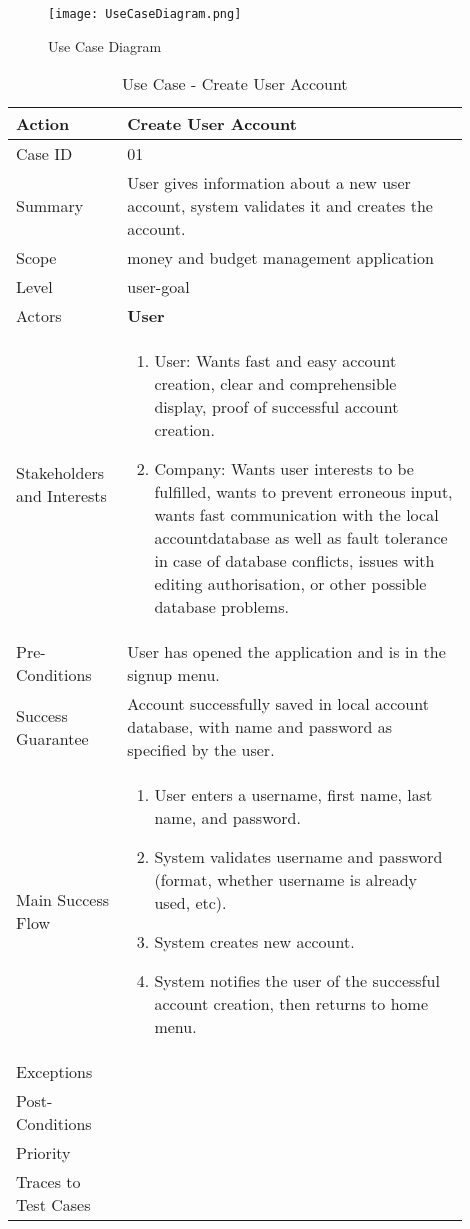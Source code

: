 \documentclass[11pt]{article}
\newcounter{use case ID}
\newcommand\tabularhead[1]{
\begin{table}[ht]
    \addtocounter{use case ID}{1}
    \caption{Use Case \arabic{use case ID} - #1}
    \vspace{0.2cm}
    \begin{tabular}{|p{0.2\linewidth}|p{0.70\linewidth}|}
    \hline
        \textbf{Action} & \textbf{#1} \\
        \hline}
\newcommand\addrow[2]{#1 & #2\\ \hline}
\newcommand\addmulrow[2]{ \begin{minipage}[t][][t]{2.5cm}#1\end{minipage}
        &\begin{minipage}[t][][t]{11cm}
        \begin{enumerate}[itemsep=-1ex] #2   \end{enumerate}
    \end{minipage}\vfill\\ \hline}
\newenvironment{usecase}{\tabularhead}
{\hline\end{tabular}\end{table}}
\begin{document}
\begin{figure}[htbp]
\texttt{[image: UseCaseDiagram.png]}
\caption{Use Case Diagram}
\label{fig:use-case-diagram}
\end{figure}

\begin{usecase}{Create User Account}
    \addrow{Case ID}{01}
    \addrow{Summary}{User gives information about a new user account, system validates it and creates the account.}
    \addrow{Scope}{money and budget management application}
    \addrow{Level}{user-goal}
    \addrow{Actors}{\textbf{User}}
    \addmulrow{Stakeholders and Interests}{
        \item User: Wants fast and easy account creation, clear and comprehensible display, proof of successful account creation.
        \item Company: Wants user interests to be fulfilled, wants to prevent erroneous input, wants fast communication with the local accountdatabase as well as fault tolerance in case of database conflicts, issues with editing authorisation, or other possible database problems.}
    \addrow{Pre-Conditions}{User has opened the application and is in the signup menu.}
    \addrow{Success Guarantee}{Account successfully saved in local account database, with name and password as specified by the user.}
    \addmulrow{Main Success Flow}{
        \item User enters a username, first name, last name, and password.
        \item System validates username and password (format, whether username is already used, etc).
        \item System creates new account.
        \item System notifies the user of the successful account creation, then returns to home menu.}
    \addrow{Exceptions}{}
    \addrow{Post-Conditions}{}
    \addrow{Priority}{}
    \addrow{Traces to Test Cases}{}
\end{usecase}
\end{document}

